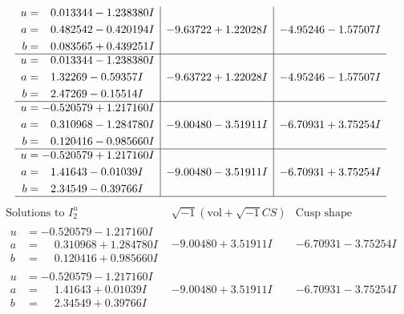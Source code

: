 \documentclass[1p]{elsarticle_modified}
\theoremstyle{definition}
\newcommand{\I}{\sqrt{-1}}
\begin{document}
$$\begin{array}{c|c|c}
\begin{aligned}
u &= \phantom{-}0.013344 - 1.238380 I \\
a &= \phantom{-}0.482542 - 0.420194 I \\
b &= \phantom{-}0.083565 + 0.439251 I\end{aligned}
 & -9.63722 + 1.22028 I & -4.95246 - 1.57507 I \\ \hline\begin{aligned}
u &= \phantom{-}0.013344 - 1.238380 I \\
a &= \phantom{-}1.32269 - 0.59357 I \\
b &= \phantom{-}2.47269 - 0.15514 I\end{aligned}
 & -9.63722 + 1.22028 I & -4.95246 - 1.57507 I \\ \hline\begin{aligned}
u &= -0.520579 + 1.217160 I \\
a &= \phantom{-}0.310968 - 1.284780 I \\
b &= \phantom{-}0.120416 - 0.985660 I\end{aligned}
 & -9.00480 - 3.51911 I & -6.70931 + 3.75254 I \\ \hline\begin{aligned}
u &= -0.520579 + 1.217160 I \\
a &= \phantom{-}1.41643 - 0.01039 I \\
b &= \phantom{-}2.34549 - 0.39766 I\end{aligned}
 & -9.00480 - 3.51911 I & -6.70931 + 3.75254 I\\
 \hline 
 \end{array}$$\newpage$$\begin{array}{c|c|c}  
\text{Solutions to }I^u_{2}& \I (\text{vol} + \sqrt{-1}CS) & \text{Cusp shape}\\
 \hline 
\begin{aligned}
u &= -0.520579 - 1.217160 I \\
a &= \phantom{-}0.310968 + 1.284780 I \\
b &= \phantom{-}0.120416 + 0.985660 I\end{aligned}
 & -9.00480 + 3.51911 I & -6.70931 - 3.75254 I \\ \hline\begin{aligned}
u &= -0.520579 - 1.217160 I \\
a &= \phantom{-}1.41643 + 0.01039 I \\
b &= \phantom{-}2.34549 + 0.39766 I\end{aligned}
 & -9.00480 + 3.51911 I & -6.70931 - 3.75254 I \\ \hline\begin{aligned}

\end{aligned}
\end{array}$$
\end{document}

